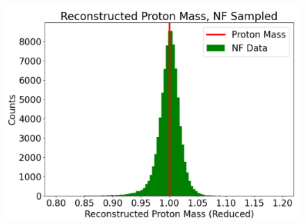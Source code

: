         
        \begin{figure}[H]
            \centering
            \label{fig:protons}
        \end{figure}
        
        
        \begin{figure}[H]
            \centering
             \begin{minipage}{0.42349\textwidth}
                \centering
                \includegraphics[width=.97\textwidth,trim={ 0 0 0 0},clip]{Chapters/Ch3-Simulations/normalizing_flows/pics/FinalPictures/updated_proton_reduced.png}
        
            \end{minipage}
            \begin{minipage}{0.421245\textwidth}
                \centering
                

\end{minipage}
\end{figure}
